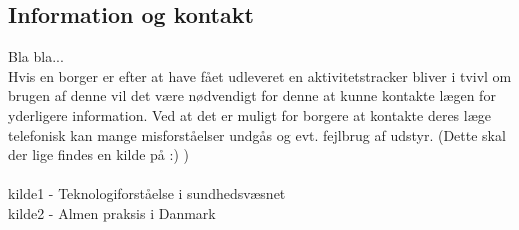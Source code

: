 \subsection{Information og kontakt}
Bla bla... \\
Hvis en borger er efter at have fået udleveret en aktivitetstracker bliver i tvivl om brugen af denne vil det være nødvendigt for denne at kunne kontakte lægen for yderligere information. Ved at det er muligt for borgere at kontakte deres læge telefonisk kan mange misforståelser undgås og evt. fejlbrug af udstyr. (Dette skal der lige findes en kilde på :) ) \\\\
kilde1 - Teknologiforståelse i sundhedsvæsnet \\
kilde2 - Almen praksis i Danmark